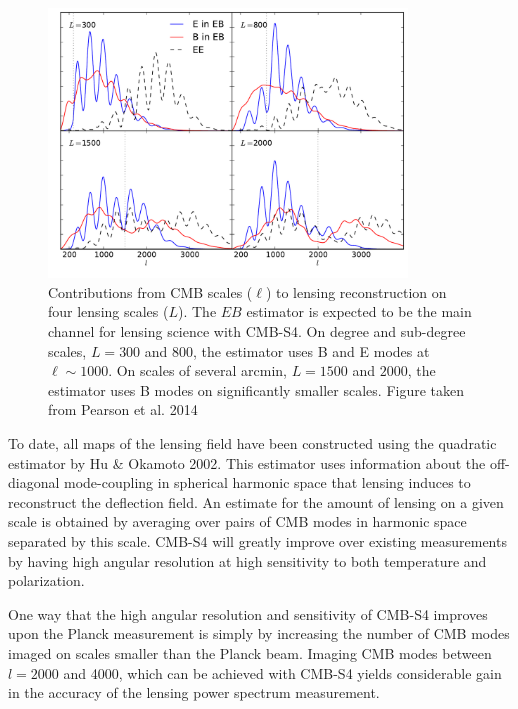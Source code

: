 \begin{figure}[h]
\centering
\includegraphics[width=0.85\textwidth]{CMBLensing/signal_contribs.pdf}
\caption{Contributions from CMB scales ($\ell$) to lensing reconstruction on four lensing scales ($L$).  The $EB$ estimator is expected to be the main channel for lensing science with CMB-S4.  On degree and sub-degree scales, $L = 300$ and $800$, the estimator uses B and E modes at $\ell \sim 1000$.  On scales of several arcmin, $L = 1500$ and $2000$, the estimator uses B modes on significantly smaller scales.  Figure taken from Pearson et al. 2014}
\label{sigCon}
\end{figure}

To date, all maps of the lensing field have been constructed using the quadratic estimator by Hu \& Okamoto 2002.  This estimator uses information about the off-diagonal mode-coupling in spherical harmonic space that lensing induces to reconstruct the deflection field.  An estimate for the amount of lensing on a given scale is obtained by averaging over pairs of CMB modes in harmonic space separated by this scale. CMB-S4 will greatly improve over existing
measurements by having high angular resolution at high sensitivity to
both temperature and polarization.

One way that the high angular resolution and sensitivity
of CMB-S4 improves upon the Planck measurement is simply
by increasing the number of CMB modes imaged on scales smaller than the Planck beam.  Imaging CMB modes between $l=2000$ and 4000, which can be achieved with CMB-S4 yields considerable gain in the accuracy of the lensing power spectrum measurement.


